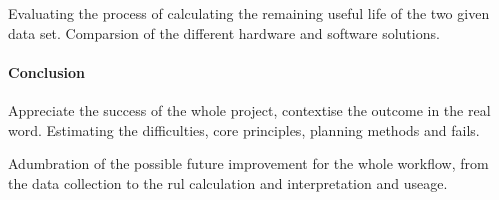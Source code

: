 Evaluating the process of calculating the remaining useful life of the two given data set. Comparsion of the different hardware and software solutions.

		\paragraph{Conclusion}

Appreciate the success of the whole project, contextise the outcome in the real word. Estimating the difficulties, core principles, planning methods and fails.

Adumbration of the possible future improvement for the whole workflow, from the data collection to the rul calculation and interpretation and useage.

